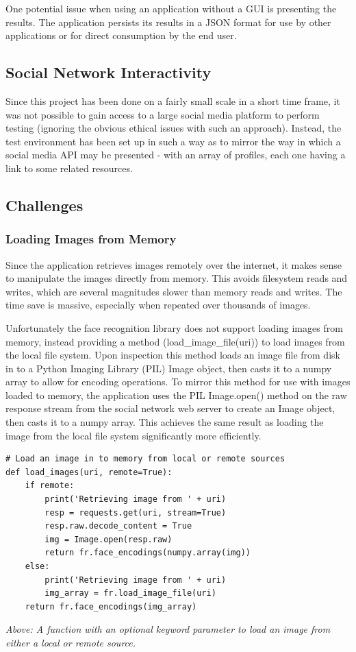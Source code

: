 \documentclass[12pt]{article}
\begin{document}
One potential issue when using an application without a GUI is presenting the results. The application persists its results in a JSON format for use by other applications or for direct consumption by the end user.

\subsection{Social Network Interactivity}
Since this project has been done on a fairly small scale in a short time frame, it was not possible to gain access to a large social media platform to perform testing (ignoring the obvious ethical issues with such an approach). Instead, the test environment has been set up in such a way as to mirror the way in which a social media API may be presented - with an array of profiles, each one having a link to some related resources.

\subsection{Challenges}
\subsubsection{Loading Images from Memory}
Since the application retrieves images remotely over the internet, it makes sense to manipulate the images directly from memory. This avoids filesystem reads and writes, which are several magnitudes slower than memory reads and writes. The time save is massive, especially when repeated over thousands of images.

Unfortunately the face recognition library does not support loading images from memory, instead providing a method (load\_image\_file(uri)) to load images from the local file system. Upon inspection this method loads an image file from disk in to a Python Imaging Library (PIL) Image object, then casts it to a numpy array to allow for encoding operations. To mirror this method for use with images loaded to memory, the application uses the PIL Image.open() method on the raw response stream from the social network web server to create an Image object, then casts it to a numpy array. This achieves the same result as loading the image from the local file system significantly more efficiently.

\begin{lstlisting}
# Load an image in to memory from local or remote sources
def load_images(uri, remote=True):
    if remote:
        print('Retrieving image from ' + uri)
        resp = requests.get(uri, stream=True)
        resp.raw.decode_content = True
        img = Image.open(resp.raw)
        return fr.face_encodings(numpy.array(img))
    else:
        print('Retrieving image from ' + uri)
        img_array = fr.load_image_file(uri)
    return fr.face_encodings(img_array)
\end{lstlisting}
\textit{Above: A function with an optional keyword parameter to load an image from either a local or remote source.}
\end{document}
